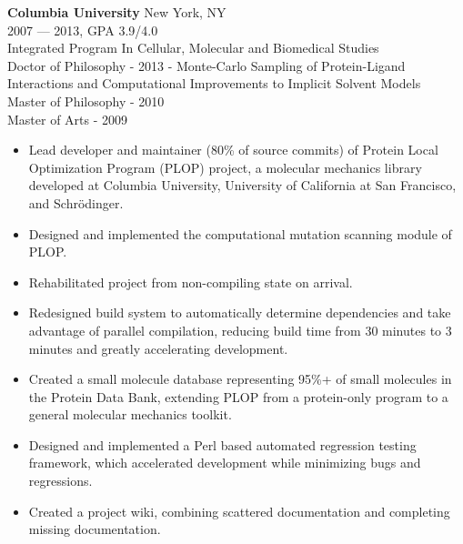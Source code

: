\vspace{\littleskip}


\myfontsize{\bigheader}
\textbf{Columbia University}
\myfontsize{\bodysize}
New York, NY\\
2007 --- 2013, GPA 3.9/4.0\\
Integrated Program In Cellular, Molecular and Biomedical Studies\\
Doctor of Philosophy - 2013 - Monte-Carlo Sampling of Protein-Ligand Interactions and Computational Improvements to Implicit Solvent Models\\
Master of Philosophy - 2010\\
Master of Arts - 2009\\

\begin{itemize}[topsep=1ex, partopsep=0ex, parsep=0ex, itemsep=0.5ex]
    \item Lead developer and maintainer ({\mytilde}80\% of source commits) of Protein Local Optimization Program (PLOP) project, a molecular mechanics library developed at Columbia University, University of California at San Francisco, and Schr\"{o}dinger.
    \item Designed and implemented the computational mutation scanning module of PLOP.
    \item Rehabilitated project from non-compiling state on arrival.
    \item Redesigned build system to automatically determine dependencies and take advantage of parallel compilation, reducing build time from {\mytilde}30 minutes to {\mytilde}3 minutes and greatly accelerating development.
    \item Created a small molecule database representing 95\%+ of small molecules in the Protein Data Bank, extending PLOP from a protein-only program to a general molecular mechanics toolkit.
    \item Designed and implemented a Perl based automated regression testing framework, which accelerated development while minimizing bugs and regressions.
    \item Created a project wiki, combining scattered documentation and completing missing documentation.
\end{itemize}
\vspace{\littleskip}


